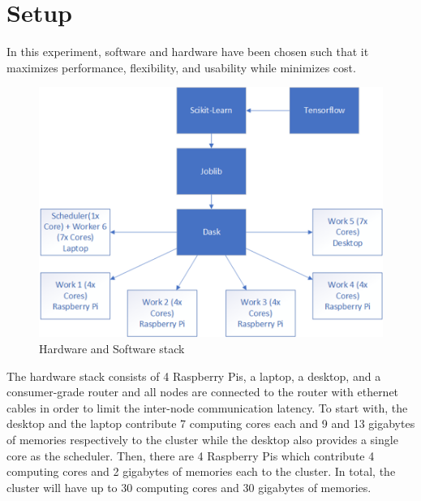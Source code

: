 \documentclass[conference]{IEEEtran}
\begin{document}
    \section{Setup}
        In this experiment, software and hardware have been chosen such that it maximizes performance, flexibility, and usability while minimizes cost. 
        
        \begin{figure}[!htb]
            \centering
            \captionsetup{justification=centering}
            \includegraphics[width=\linewidth]{Stack.png}
            \caption{Hardware and Software stack}  
        \end{figure}
            
        The hardware stack consists of 4 Raspberry Pis, a laptop, a desktop, and a consumer-grade router and all nodes are connected to the router with ethernet cables in order to limit the inter-node communication latency. To start with, the desktop and the laptop contribute 7 computing cores each and 9 and 13 gigabytes of memories respectively to the cluster while the desktop also provides a single core as the scheduler. Then, there are 4 Raspberry Pis which contribute 4 computing cores and 2 gigabytes of memories each to the cluster. In total, the cluster will have up to 30 computing cores and 30 gigabytes of memories.
\end{document}
